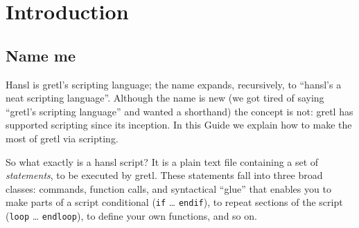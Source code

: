 \chapter{Introduction}
\label{intro}

\section{Name me}

Hansl is gretl's scripting language; the name expands, recursively, to
``hansl's a neat scripting language''. Although the name is new (we
got tired of saying ``gretl's scripting language'' and wanted a
shorthand) the concept is not: gretl has supported scripting since its
inception. In this Guide we explain how to make the most of gretl via
scripting.

So what exactly is a hansl script? It is a plain text file containing
a set of \textsl{statements}, to be executed by gretl. These
statements fall into three broad classes: commands, function calls,
and syntactical ``glue'' that enables you to make parts of a script
conditional (\texttt{if} \dots{} \texttt{endif}), to repeat sections
of the script (\texttt{loop} \dots{} \texttt{endloop}), to define your
own functions, and so on.

      
